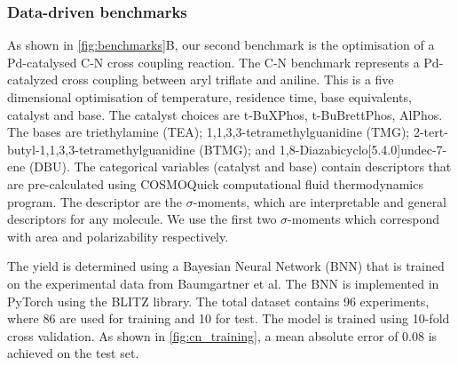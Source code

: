  
\subsubsection{Data-driven benchmarks}


As shown in \ref{fig:benchmarks}B, our second benchmark is the optimisation of a Pd-catalysed C-N cross coupling reaction. The C-N benchmark represents a Pd-catalyzed cross coupling between aryl triflate and aniline.\cite{Baumgartner2019} This is a five dimensional optimisation of temperature, residence time, base equivalents, catalyst and base. The catalyst choices are t-BuXPhos, t-BuBrettPhos, AlPhos. The bases are triethylamine (TEA); 1,1,3,3-tetramethylguanidine (TMG); 2-tert-butyl-1,1,3,3-tetramethylguanidine (BTMG); and 1,8-Diazabicyclo[5.4.0]undec-7-ene (DBU). The categorical variables (catalyst and base) contain descriptors that are pre-calculated using COSMOQuick computational fluid thermodynamics program.\cite{Loschen2012} The descriptor are the $\sigma$-moments, which are interpretable and general descriptors for any molecule.\cite{Zissimos2002} We use the first two $\sigma$-moments which correspond with area and polarizability respectively.

The yield is determined using a Bayesian Neural Network (BNN) that is trained on the experimental data from Baumgartner et al.\cite{Baumgartner2019} The BNN is implemented in PyTorch\cite{Paszke2019} using the BLITZ library.\cite{Esposito2020}  The total dataset contains 96 experiments, where 86 are used for training and 10 for test. The model is trained using 10-fold cross validation. As shown in \ref{fig:cn_training}, a mean absolute error of 0.08 is achieved on the test set.


